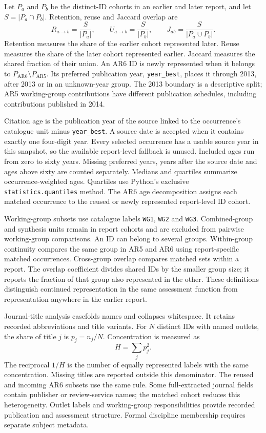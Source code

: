 \documentclass[11pt,a4paper]{article}
\begin{document}
Let $P_a$ and $P_b$ be the distinct-ID cohorts in an earlier and later report, and let $S=|P_a\cap P_b|$. Retention, reuse and Jaccard overlap are
\begin{equation}
R_{a\rightarrow b}=\frac{S}{|P_a|},\qquad
U_{a\rightarrow b}=\frac{S}{|P_b|},\qquad
J_{ab}=\frac{S}{|P_a\cup P_b|}.
\end{equation}
Retention measures the share of the earlier cohort represented later. Reuse measures the share of the later cohort represented earlier. Jaccard measures the shared fraction of their union. An AR6 ID is newly represented when it belongs to $P_{\mathrm{AR6}}\setminus P_{\mathrm{AR5}}$. Its preferred publication year, \texttt{year\_best}, places it through 2013, after 2013 or in an unknown-year group. The 2013 boundary is a descriptive split; AR5 working-group contributions have different publication schedules, including contributions published in 2014.

Citation age is the publication year of the source linked to the occurrence's catalogue unit minus \texttt{year\_best}. A source date is accepted when it contains exactly one four-digit year. Every selected occurrence has a usable source year in this snapshot, so the available report-level fallback is unused. Included ages run from zero to sixty years. Missing preferred years, years after the source date and ages above sixty are counted separately. Medians and quartiles summarize occurrence-weighted ages. Quartiles use Python's exclusive \texttt{statistics.quantiles} method. The AR6 age decomposition assigns each matched occurrence to the reused or newly represented report-level ID cohort.

Working-group subsets use catalogue labels \texttt{WG1}, \texttt{WG2} and \texttt{WG3}. Combined-group and synthesis units remain in report cohorts and are excluded from pairwise working-group comparisons. An ID can belong to several groups. Within-group continuity compares the same group in AR5 and AR6 using report-specific matched occurrences. Cross-group overlap compares matched sets within a report. The overlap coefficient divides shared IDs by the smaller group size; it reports the fraction of that group also represented in the other. These definitions distinguish continued representation in the same assessment function from representation anywhere in the earlier report.

Journal-title analysis casefolds names and collapses whitespace. It retains recorded abbreviations and title variants. For $N$ distinct IDs with named outlets, the share of title $j$ is $p_j=n_j/N$. Concentration is measured as
\begin{equation}
H=\sum_j p_j^2.
\end{equation}
The reciprocal $1/H$ is the number of equally represented labels with the same concentration. Missing titles are reported outside this denominator. The reused and incoming AR6 subsets use the same rule. Some full-extracted journal fields contain publisher or review-service names; the matched cohort reduces this heterogeneity. Outlet labels and working-group responsibilities provide recorded publication and assessment structure. Formal discipline membership requires separate subject metadata.
\end{document}
